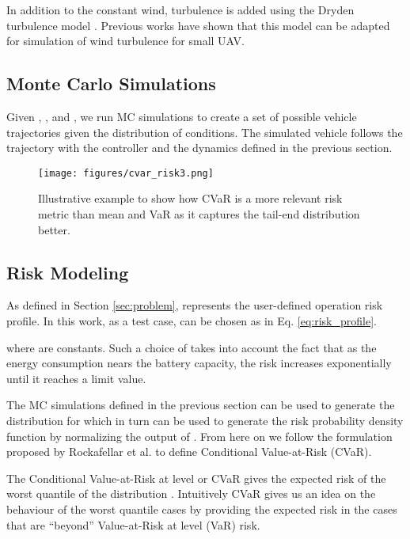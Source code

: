 \documentclass[letterpaper, 10 pt, conference]{ieeeconf}
\begin{document}
In addition to the constant wind, turbulence is added using the Dryden turbulence model \cite{mil}. 
Previous works \cite{abichandani2020wind,wasland2009, allison2018, Beard2012SmallUA} have shown that this model can be adapted for simulation of wind turbulence for small UAV.

\subsection{Monte Carlo Simulations}
\label{sec:mc}

Given , , and , we run  MC simulations to create a set of possible vehicle trajectories given the distribution of conditions. 
The simulated vehicle follows the trajectory  with the controller  and the dynamics defined in the previous section.
\begin{figure*}
    \centering
    \texttt{[image: figures/cvar\_risk3.png]}
    \caption{Illustrative example to show how CVaR is a more relevant risk metric than mean and VaR as it captures the tail-end distribution better. }
    \label{fig:cvar_risk}
    \vspace{-2.5mm}
\end{figure*}





\subsection{Risk Modeling}
\label{sec:risk}

As defined in Section \ref{sec:problem},  represents the user-defined operation risk profile. In this work, as a test case,  can be chosen as in Eq. \ref{eq:risk_profile}.

where  are constants. Such a choice of  takes into account the fact that as the energy consumption nears the battery capacity, the risk increases exponentially until it reaches a limit value. 
\par The MC simulations defined in the previous section can be used to generate the distribution for  which in turn can be used to generate the risk probability density function  by normalizing the output of . From here on we follow the formulation proposed by Rockafellar et al. \cite{rockafellar2000optimization} to define Conditional Value-at-Risk (CVaR).



The Conditional Value-at-Risk at level  or CVaR gives the expected risk of the worst  quantile of the distribution . Intuitively CVaR gives us an idea on the behaviour of the worst  quantile cases by providing the expected risk in the cases that are ``beyond'' Value-at-Risk at level  (VaR) risk.
\end{document}
